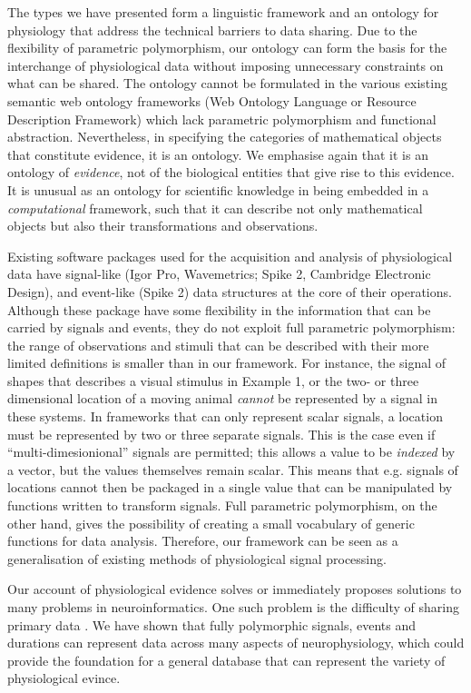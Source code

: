 The types we have presented form a linguistic framework and an
ontology for physiology that address the technical barriers to data
sharing. Due to the flexibility of parametric polymorphism, our
ontology can form the basis for the interchange of physiological data
without imposing unnecessary constraints on what can be shared. The
ontology cannot be formulated in the various existing semantic web
ontology frameworks (Web Ontology Language or Resource Description
Framework) which lack parametric polymorphism and functional
abstraction. Nevertheless, in specifying the categories of
mathematical objects that constitute evidence, it is an ontology. We
emphasise again that it is an ontology of \emph{evidence}, not of the
biological entities that give rise to this evidence. It is unusual as
an ontology for scientific knowledge in being embedded in a
\emph{computational} framework, such that it can describe not only
mathematical objects but also their transformations and observations.

Existing software packages used for the acquisition and analysis of
physiological data have signal-like (Igor Pro, Wavemetrics; Spike 2,
Cambridge Electronic Design), and event-like (Spike 2) data structures
at the core of their operations. Although these package have some
flexibility in the information that can be carried by signals and
events, they do not exploit full parametric polymorphism: the range of
observations and stimuli that can be described with their more limited
definitions is smaller than in our framework. For instance, the signal
of shapes that describes a visual stimulus in Example 1, or the two-
or three dimensional location of a moving animal \emph{cannot} be
represented by a signal in these systems. In frameworks that can only
represent scalar signals, a location must be represented by two or
three separate signals. This is the case even if
``multi-dimesionional'' signals are permitted; this allows a value to
be \emph{indexed} by a vector, but the values themselves remain
scalar. This means that e.g. signals of locations cannot then be
packaged in a single value that can be manipulated by functions
written to transform signals. Full parametric polymorphism, on the
other hand, gives the possibility of creating a small vocabulary of
generic functions for data analysis. Therefore, our framework can be
seen as a generalisation of existing methods of physiological signal
processing.

Our account of physiological evidence solves or immediately proposes
solutions to many problems in neuroinformatics. One such problem is
the difficulty of sharing primary data \citep{Amari2002}. We have
shown that fully polymorphic signals, events and durations can
represent data across many aspects of neurophysiology, which could
provide the foundation for a general database that can represent the
variety of physiological evince. 

